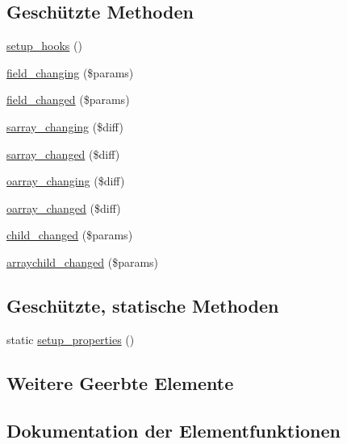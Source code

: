 \subsection*{Geschützte Methoden}
\begin{DoxyCompactItemize}
\item 
\hyperlink{classTests_1_1Feature_1_1HookingObject_aa087133578f3ec2983cb4cfaaa790770}{setup\+\_\+hooks} ()
\item 
\hyperlink{classTests_1_1Feature_1_1HookingObject_a36bb3ab8319ceacb50d293484d3a40cd}{field\+\_\+changing} (\$params)
\item 
\hyperlink{classTests_1_1Feature_1_1HookingObject_ae358c2036c1d42e96c4cd0aaba158f6e}{field\+\_\+changed} (\$params)
\item 
\hyperlink{classTests_1_1Feature_1_1HookingObject_adfad7402a74345fd191b09b9bf2ff808}{sarray\+\_\+changing} (\$diff)
\item 
\hyperlink{classTests_1_1Feature_1_1HookingObject_ab1de8e790648eca2999ae9a383d29bed}{sarray\+\_\+changed} (\$diff)
\item 
\hyperlink{classTests_1_1Feature_1_1HookingObject_a63a94ee02b99f38a4369ca610d6e6221}{oarray\+\_\+changing} (\$diff)
\item 
\hyperlink{classTests_1_1Feature_1_1HookingObject_acceed80030a659032e379e5d7d948937}{oarray\+\_\+changed} (\$diff)
\item 
\hyperlink{classTests_1_1Feature_1_1HookingObject_a313d45e59a0fd09ea8e22e22a67eb020}{child\+\_\+changed} (\$params)
\item 
\hyperlink{classTests_1_1Feature_1_1HookingObject_a3e25814129e200b573d3b67f36018a64}{arraychild\+\_\+changed} (\$params)
\end{DoxyCompactItemize}
\subsection*{Geschützte, statische Methoden}
\begin{DoxyCompactItemize}
\item 
static \hyperlink{classTests_1_1Feature_1_1HookingObject_ae7962810a21d72ff403ee267870b60ff}{setup\+\_\+properties} ()
\end{DoxyCompactItemize}
\subsection*{Weitere Geerbte Elemente}


\subsection{Dokumentation der Elementfunktionen}
\mbox{\label{classTests_1_1Feature_1_1HookingObject_a3e25814129e200b573d3b67f36018a64}} 
